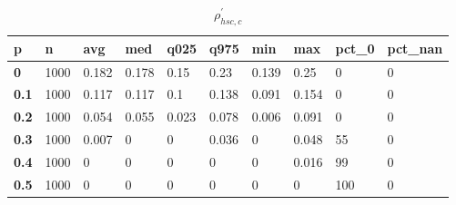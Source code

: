 \begin{table}[h]
 \centering 
\footnotesize
\caption{$\rho_{hsc,c}^\prime $}
\label{tab:alphahscc}
\begin{tabular}[h]{|l|l|l|l|l|l|l|l|l|l|
    } \hline
\textbf{ p} & \textbf{ n} & \textbf{ avg} & \textbf{ med} & \textbf{ q025} & \textbf{ q975} & \textbf{ min} & \textbf{ max} & \textbf{ pct\_0} & \textbf{ pct\_nan}
    \\ \hline
  \textbf{  0} & 1000 & 0.182 & 0.178 &  0.15 &  0.23 & 0.139 &  0.25 &   0 & 0
    \\ \hline
  \textbf{0.1} & 1000 & 0.117 & 0.117 &   0.1 & 0.138 & 0.091 & 0.154 &   0 & 0
    \\ \hline
  \textbf{0.2} & 1000 & 0.054 & 0.055 & 0.023 & 0.078 & 0.006 & 0.091 &   0 & 0
    \\ \hline
  \textbf{0.3} & 1000 & 0.007 &     0 &     0 & 0.036 &     0 & 0.048 &  55 & 0
    \\ \hline
  \textbf{0.4} & 1000 &     0 &     0 &     0 &     0 &     0 & 0.016 &  99 & 0
    \\ \hline
  \textbf{0.5} & 1000 &     0 &     0 &     0 &     0 &     0 &     0 & 100 & 0
    \\ \hline
 \end{tabular}
 \end{table}
